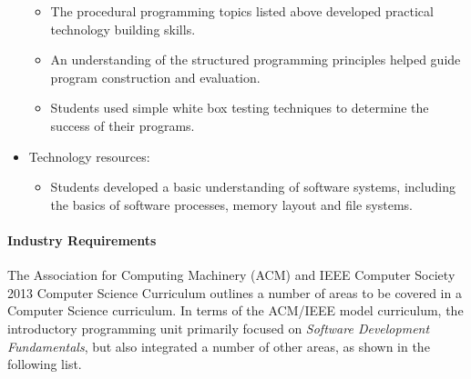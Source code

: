 \begin{itemize}[noitemsep,nolistsep]
\begin{itemize}[noitemsep,nolistsep]
		\item The procedural programming topics listed above developed practical technology building skills.
		\item An understanding of the structured programming principles helped guide program construction and evaluation.
		\item Students used simple white box testing techniques to determine the success of their programs.
	\end{itemize}
	\item Technology resources:
	\begin{itemize}[noitemsep,nolistsep]
		\item Students developed a basic understanding of software systems, including the basics of software processes, memory layout and file systems.
	\end{itemize}
\end{itemize}


\paragraph{Industry Requirements} %
\label{par:industry_requirements}

The Association for Computing Machinery (ACM) and IEEE Computer Society 2013 Computer Science Curriculum \cite{CSC2013} outlines a number of areas to be covered in a Computer Science curriculum. In terms of the ACM/IEEE model curriculum, the introductory programming unit primarily focused on \emph{Software Development Fundamentals}, but also integrated a number of other areas, as shown in the following list.

